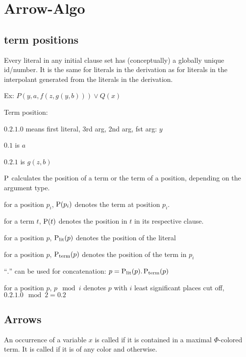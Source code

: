 \documentclass[,%
	paper=a4,%
	DIV14, %
	twoside=false,%
	liststotoc,
	bibtotoc,
	draft=false,%
	numbers=noendperiod
]{scrartcl}
\begin{document}
\newcommand{\lif}[1]{\lift{\Delta}{#1}{x}}



\section{Arrow-Algo}

\subsection{term positions}

Every literal in any initial clause set has (conceptually) a globally unique id/number.
It is the same for literals in the derivation as for literals in the interpolant generated from the literals in the derivation.

Ex: $P(y, a, f(z, g(y, b)) ) \lor Q(x)$

Term position:

$0.2.1.0$ means first literal, 3rd arg, 2nd arg, fst arg: $y$

$0.1$ is $a$

$0.2.1$ is $g(z, b)$

$\operatorname{{\operatorname P}}$ calculates the position of a term or the term of a position, depending on the argument type.

for a position $p_i$, $\operatorname{{\operatorname P}}(p_i)$ denotes the term at position $p_i$.

for a term $t$, $\operatorname{{\operatorname P}}(t)$ denotes the position in $t$ in its respective clause.

for a position $p$, $\operatorname{\operatorname{{\operatorname P}}_\mathrm{lit}}(p)$ denotes the position of the literal

for a position $p$, $\operatorname{\operatorname{{\operatorname P}}_\mathrm{term}}(p)$ denotes the position of the term in $p_i$ 

``$.$'' can be used for concatenation: $p = \operatorname{\operatorname{{\operatorname P}}_\mathrm{lit}}(p).\operatorname{\operatorname{{\operatorname P}}_\mathrm{term}}(p)$

for a position $p$, $p \mod i$ denotes $p$ with $i$ least significant places cut off, $0.2.1.0 \mod 2 = 0.2$

\subsection{Arrows}

\begin{defi}
	An occurrence of a variable $x$ is called  if it is contained in a maximal $\Phi$-colored term. It is called  if it is of any color and  otherwise.
\end{defi}
\end{document}
